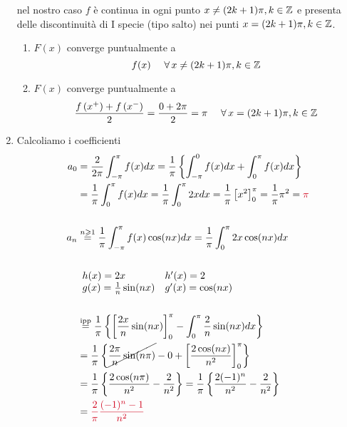 \begin{enumerate}
nel nostro caso $f$ è continua in ogni punto $x\neq ( 2k+1) \pi ,k\in \mathbb{Z} $ e presenta delle discontinuità di I specie (tipo salto) nei punti $x=( 2k+1) \pi ,k\in \mathbb{Z} $.
\begin{enumerate}
\item $F( x)$ converge puntualmente a\begin{equation*}
f( x) \ \ \ \ \forall x\neq ( 2k+1) \pi ,k\in \ZZ 
\end{equation*}
\item $F( x)$ converge puntualmente a\begin{equation*}
\frac{f\left( x^{+}\right) +f\left( x^{-}\right)}{2} =\frac{0+2\pi }{2} =\pi \ \ \ \ \forall x=( 2k+1) \pi ,k\in \ZZ 
\end{equation*}
\end{enumerate}
\item Calcoliamo i coefficienti\begin{align*}
a_{0} & =\frac{2}{2\pi }\int ^{\pi }_{-\pi } f( x) dx=\frac{1}{\pi }\left\{\int ^{0}_{-\pi } f( x) dx+\int ^{\pi }_{0} f( x) dx\right\}\\
 & =\frac{1}{\pi }\int ^{\pi }_{0} f( x) dx=\frac{1}{\pi }\int ^{\pi }_{0} 2xdx=\frac{1}{\pi }\left[ x^{2}\right]^{\pi }_{0} =\frac{1}{\pi } \pi ^{2} =\textcolor[rgb]{0.82,0.01,0.11}{\pi }\\
 & \\
a_{n} & \overset{n\geqslant 1}{=}\frac{1}{\pi }\int ^{\pi }_{-\pi } f( x)\cos( nx) dx=\frac{1}{\pi }\int ^{\pi }_{0} 2x\cos( nx) dx\\
 & \\
 & \begin{array}{ l l }
h( x) =2x & h'( x) =2\\
g( x) =\frac{1}{n}\sin( nx) & g'( x) =\cos( nx)
\end{array}\\
 & \\
 & \overset{\text{ipp}}{=}\frac{1}{\pi }\left\{\left[\frac{2x}{n}\sin( nx)\right]^{\pi }_{0} -\int ^{\pi }_{0}\frac{2}{n}\sin( nx) dx\right\}\\
 & =\frac{1}{\pi }\left\{\cancel{\frac{2\pi }{n}\sin( n\pi )} -0+\left[\frac{2\cos( nx)}{n^{2}}\right]^{\pi }_{0}\right\}\\
 & =\frac{1}{\pi }\left\{\frac{2\cos( n\pi )}{n^{2}} -\frac{2}{n^{2}}\right\} =\frac{1}{\pi }\left\{\frac{2( -1)^{n}}{n^{2}} -\frac{2}{n^{2}}\right\}\\
 & =\textcolor[rgb]{0.82,0.01,0.11}{\frac{2}{\pi }}\textcolor[rgb]{0.82,0.01,0.11}{\frac{( -1)^{n} -1}{n^{2}}}\\

\end{align*}
\end{enumerate}
